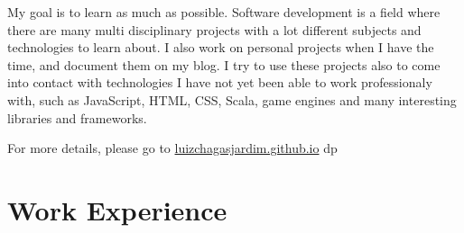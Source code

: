 \documentclass[a4paper,10pt]{article}
\newcommand{\cvtype}{d}
\begin{document}
{\quad}My goal is to learn as much as possible. Software development is a field where there are many multi disciplinary projects with a lot different subjects and technologies to learn about. I also work on personal projects when I have the time, and document them on my blog. I try to use these projects also to come into contact with technologies I have not yet been able to work professionaly with, such as JavaScript, HTML, CSS, Scala, game engines and many interesting libraries and frameworks.

{\quad}\footnotesize{For more details, please go to \href{http://luizchagasjardim.github.io}{luizchagasjardim.github.io}}
\else
	\if \cvtype p

	\fi
\fi

\section{Work Experience}
\end{document}
